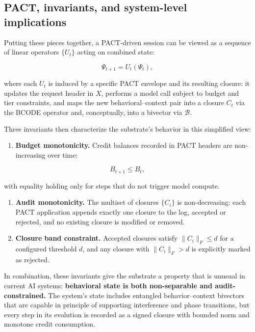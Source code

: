 \documentclass{article}
\providecommand{\tightlist}{\setlength{\itemsep}{0pt}\setlength{\parskip}{0pt}}
\begin{document}
\subsection{PACT, invariants, and system-level
implications}\label{pact-invariants-and-system-level-implications}

Putting these pieces together, a PACT-driven session can be viewed as a
sequence of linear operators \(\{U_t\}\) acting on combined state:

\[
\Psi_{t+1} = U_t(\Psi_t),
\]

where each \(U_t\) is induced by a specific PACT envelope and its
resulting closure: it updates the request header in \(X\), performs a
model call subject to budget and tier constraints, and maps the new
behavioral--context pair into a closure \(C_t\) via the BCODE operator
and, conceptually, into a bivector via \(\mathcal{B}\).

Three invariants then characterize the substrate's behavior in this
simplified view:

\begin{enumerate}
\def\labelenumi{\arabic{enumi}.}
\tightlist
\item
  \textbf{Budget monotonicity.} Credit balances recorded in PACT headers
  are non-increasing over time:
\end{enumerate}

\[
B_{t+1} \le B_t,
\]

with equality holding only for steps that do not trigger model compute.

\begin{enumerate}
\def\labelenumi{\arabic{enumi}.}
\setcounter{enumi}{1}
\item
  \textbf{Audit monotonicity.} The multiset of closures \(\{C_i\}\) is
  non-decreasing: each PACT application appends exactly one closure to
  the log, accepted or rejected, and no existing closure is modified or
  removed.
\item
  \textbf{Closure band constraint.} Accepted closures satisfy
  \(\|C_i\|_F \le d\) for a configured threshold \(d\), and any closure
  with \(\|C_i\|_F > d\) is explicitly marked as rejected.
\end{enumerate}

In combination, these invariants give the substrate a property that is
unusual in current AI systems: \textbf{behavioral state is both
non-separable and audit-constrained.} The system's state includes
entangled behavior--context bivectors that are capable in principle of
supporting interference and phase transitions, but every step in its
evolution is recorded as a signed closure with bounded norm and monotone
credit consumption.
\end{document}
